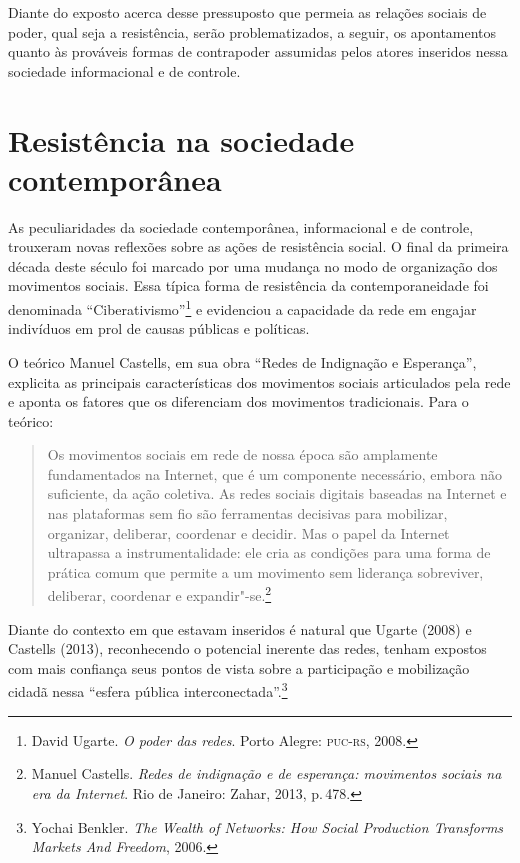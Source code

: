 Diante do exposto acerca desse pressuposto que permeia as relações
sociais de poder, qual seja a resistência, serão problematizados, a
seguir, os apontamentos quanto às prováveis formas de contrapoder
assumidas pelos atores inseridos nessa sociedade informacional e de
controle.

\section{Resistência na sociedade contemporânea}

As peculiaridades da sociedade contemporânea, informacional e de
controle, trouxeram novas reflexões sobre as ações de resistência
social. O final da primeira década deste século foi marcado por uma
mudança no modo de organização dos movimentos sociais. Essa típica forma
de resistência da contemporaneidade foi denominada ``Ciberativismo''\footnote{David Ugarte. \emph{O poder das redes}. Porto Alegre: \textsc{puc-rs}, 2008.} e evidenciou a capacidade da rede em engajar indivíduos
em prol de causas públicas e políticas.

O teórico Manuel Castells, em sua obra ``Redes de Indignação e
Esperança'', explicita as principais características dos movimentos
sociais articulados pela rede e aponta os fatores que os diferenciam dos
movimentos tradicionais. Para o teórico:

\begin{quote}
Os movimentos sociais em rede de nossa época são amplamente
fundamentados na Internet, que é um componente necessário, embora não
suficiente, da ação coletiva. As redes sociais digitais baseadas na
Internet e nas plataformas sem fio são ferramentas decisivas para
mobilizar, organizar, deliberar, coordenar e decidir. Mas o papel da
Internet ultrapassa a instrumentalidade: ele cria as condições para uma
forma de prática comum que permite a um movimento sem liderança
sobreviver, deliberar, coordenar e expandir"-se.\footnote{Manuel Castells. \emph{Redes de indignação e de esperança: movimentos sociais na era da Internet}. Rio de Janeiro: Zahar, 2013, p.\,478.}
\end{quote}

Diante do contexto em que estavam inseridos é natural que Ugarte (2008)
e Castells (2013), reconhecendo o potencial inerente das redes, tenham
expostos com mais confiança seus pontos de vista sobre a participação e
mobilização cidadã nessa ``esfera pública interconectada''.\footnote{Yochai Benkler. \emph{The Wealth of Networks: How Social Production Transforms Markets And Freedom}, 2006.}


